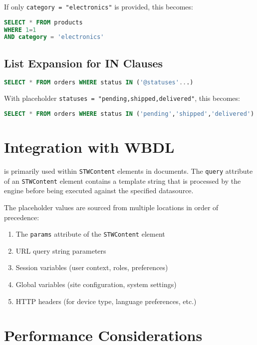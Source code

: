 If only \texttt{category = "electronics"} is provided, this becomes:
\begin{lstlisting}[language=SQL]
SELECT * FROM products 
WHERE 1=1 
AND category = 'electronics'
\end{lstlisting}

\subsection{List Expansion for IN Clauses}

\begin{lstlisting}[language=SQL,caption={WBPL List Expansion}]
SELECT * FROM orders WHERE status IN ('@statuses'...)
\end{lstlisting}

With placeholder \texttt{statuses = "pending,shipped,delivered"}, this becomes:
\begin{lstlisting}[language=SQL]
SELECT * FROM orders WHERE status IN ('pending','shipped','delivered')
\end{lstlisting}

\section{Integration with WBDL}
\label{sec:wbpl-integration}

\wbpl{} is primarily used within \texttt{STWContent} elements in \wbdl{} documents. The \texttt{query} attribute of an \texttt{STWContent} element contains a template string that is processed by the \wbpl{} engine before being executed against the specified datasource.

The placeholder values are sourced from multiple locations in order of precedence:
\begin{enumerate}
\item The \texttt{params} attribute of the \texttt{STWContent} element
\item URL query string parameters
\item Session variables (user context, roles, preferences)
\item Global variables (site configuration, system settings)
\item HTTP headers (for device type, language preferences, etc.)
\end{enumerate}

\section{Performance Considerations}
\label{sec:wbpl-performance}

